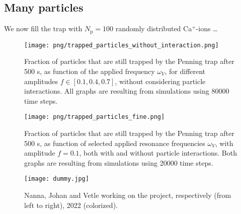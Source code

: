 \subsection{Many particles}

We now fill the trap with $N_\mathrm{p} = 100$ randomly distributed Ca$^+$-ions \dots

\begin{figure}
    \texttt{[image: png/trapped\_particles\_without\_interaction.png]}
    \caption{Fraction of particles that are still trapped by the Penning trap after 500 \textmu s, as function of the applied frequency $\omega_V$, for different amplitudes $f\in[0.1, 0.4, 0.7]$, without considering particle interactions. All graphs are resulting from simulations using 80000 time steps.}
    \label{fig:trapped_without}
\end{figure}

\begin{figure}
    \texttt{[image: png/trapped\_particles\_fine.png]}
    \caption{Fraction of particles that are still trapped by the Penning trap after 500 \textmu s, as function of selected applied resonance frequencies $\omega_V$, with amplitude $f=0.1$, both with and without particle interactions. Both graphs are resulting from simulations using 20000 time steps.}
    \label{fig:trapped_with}
\end{figure}



\begin{figure}
    \texttt{[image: dummy.jpg]}
    \caption{Nanna, Johan and Vetle working on the project, respectively (from left to right), 2022 (colorized).}
    \label{fig:some_ref} 
\end{figure} 




 





